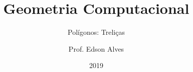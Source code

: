 \title{Geometria Computacional}
\subtitle{Polígonos: Treliças}
\date{2019}
\author{Prof. Edson Alves}
